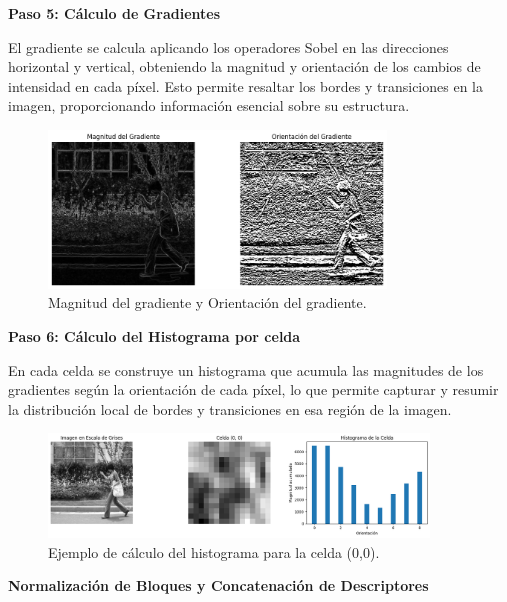 \documentclass[a4paper]{article}
\begin{document}
\textbf{Paso 5: Cálculo de Gradientes}
\par\vspace{0.5cm}

El gradiente se calcula aplicando los operadores Sobel en las direcciones horizontal y vertical, obteniendo la magnitud y orientación de los cambios de intensidad en cada píxel. Esto permite resaltar los bordes y transiciones en la imagen, proporcionando información esencial sobre su estructura.

\begin{figure}[H]
    \centering
    \includegraphics[width=0.8\textwidth]{images/hog_paso_5.png}
    \caption{Magnitud del gradiente y Orientación del gradiente.}
\end{figure}

\textbf{Paso 6: Cálculo del Histograma por celda}
\par\vspace{0.5cm}

En cada celda se construye un histograma que acumula las magnitudes de los gradientes según la orientación de cada píxel, lo que permite capturar y resumir la distribución local de bordes y transiciones en esa región de la imagen.

\begin{figure}[H]
    \centering
    \includegraphics[width=0.9\textwidth]{images/hog_paso_6.png}
    \caption{Ejemplo de cálculo del histograma para la celda (0,0).}
\end{figure}

\textbf{Normalización de Bloques y Concatenación de Descriptores}
\par\vspace{0.5cm}
\end{document}
